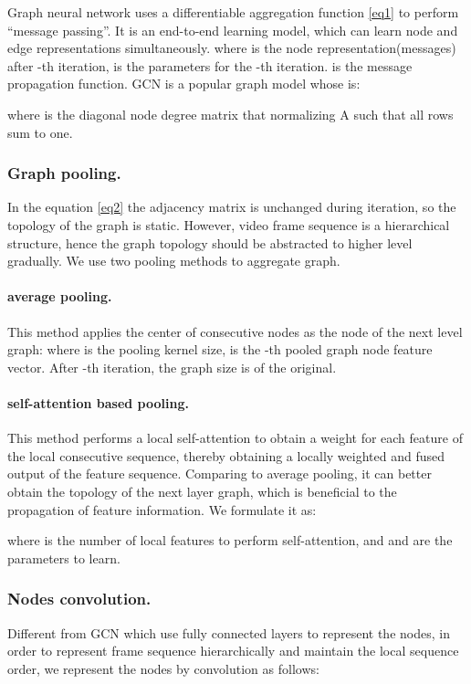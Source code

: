 \documentclass[runningheads]{llncs}
\begin{document}
Graph neural network uses a differentiable aggregation function \ref{eq1} to perform “message passing”. It is an end-to-end learning model, which can learn node and edge representations simultaneously.
 where  is the node representation(messages) after -th iteration,  is the parameters for the  -th iteration.  is the message propagation function. GCN\cite{kipf2016semi} is a popular graph model whose  is:


where  is the diagonal node degree matrix that normalizing A such that all rows sum to one.

\subsubsection{Graph pooling.} 
In the equation \ref{eq2} the adjacency matrix  is unchanged during iteration, so the topology of the graph is static. However, video frame sequence is a hierarchical structure, hence the graph topology should be abstracted to higher level gradually. We use two pooling methods to aggregate graph.

\paragraph{average pooling.}
This method applies the center of  consecutive nodes as the node of the next level graph:
 where  is the pooling kernel size,  is the -th pooled graph node feature vector. After -th iteration, the graph size is  of the original. 

\paragraph{self-attention based pooling.}
This method performs a local self-attention to obtain a weight  for each feature of the local consecutive sequence, thereby obtaining a locally weighted and fused output of the feature sequence. Comparing to average pooling, it can better obtain the topology of the next layer graph, which is beneficial to the propagation of feature information. We formulate it as:

 where  is the number of local features to perform self-attention, and  and  are the parameters to learn.

\subsubsection{Nodes convolution.} 
Different from GCN\cite{kipf2016semi} which use fully connected layers to represent the nodes, in order to represent frame sequence hierarchically and maintain the local sequence order, we represent the nodes by convolution as follows:
\end{document}
